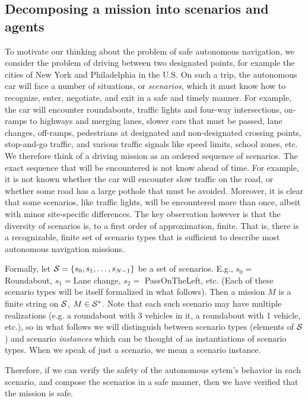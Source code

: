 \subsection{Decomposing a mission into scenarios and agents}
\label{scenarios and agents}
To motivate our thinking about the problem of safe autonomous navigation, we consider the problem of driving between two designated points, for example the cities of New York and Philadelphia in the U.S.
On such a trip, the autonomous car will face a number of situations, or \emph{scenarios}, which it must know how to recognize, enter, negotiate, and exit in a safe and timely manner.
For example, the car will encounter roundabouts, 
traffic lights and four-way intersections, 
on-ramps to highways and merging lanes, 
slower cars that must be passed, 
lane changes, 
off-ramps, 
pedestrians at designated and non-designated crossing points, 
stop-and-go traffic, 
and various traffic signals like speed limits, school zones, etc.
We therefore think of a driving mission as an ordered sequence of scenarios.
The exact sequence that will be encountered is not know ahead of time. 
For example, it is not known whether the car will encounter slow traffic on the road, or whether some road has a large pothole that must be avoided.
Moreover, it is clear that some scenarios, like traffic lights, will be encountered more than once, albeit with minor site-specific differences. 
The key observation however is that the diversity of scenarios is, to a first order of approximation, finite. 
That is, there is a recognizable, finite set of scenario types that is sufficient to describe most autonomous navigation missions.

Formally, let $\mathcal{S} = \{s_0,s_1,\ldots,s_{N-1}\}$ be a set of scenarios. 
E.g., $s_0 = $ Roundabout, $s_1 = $Lane change, $s_2 = $ PassOnTheLeft, etc. 
(Each of these scenario types will be itself formalized in what follows).
Then a mission $M$ is a finite string on $\mathcal{S}$, $M \in \mathcal{S}^*$.
Note that each such scenario may have multiple realizations (e.g. a roundabout with 3 vehicles in it, a roundabout with 1 vehicle, etc.), so in what follows we will distinguish between scenario types (elements of $\mathcal{S}$) and scenario \emph{instances} which can be thought of as instantiations of scenario types.
When we speak of just a scenario, we mean a scenario instance.

Therefore, if we can verify the safety of the autonomous sytem's behavior in each scenario,
and compose the scenarios in a safe manner, 
then we have verified that the mission is safe.

